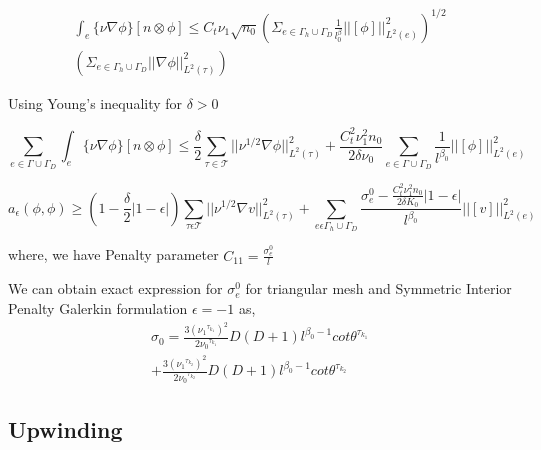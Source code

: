 \documentclass[a4paper,12pt]{book}
\begin{document}
\begin{equation}
\begin{split}
\int_e \lbrace \nu \nabla \phi \rbrace[n \otimes \phi] \leq C_t \nu_1 \sqrt{n_0} \left( \Sigma_{e \in \Gamma_h \cup \Gamma_D} \frac{1}{l^\beta_0} ||[\phi]||^2_{L^2(e)} \right)^{1/2} \\ \left( \Sigma_{e \in \Gamma_h \cup \Gamma_D} ||\nabla \phi||^2_{L^2(\tau)} \right)
\end{split}
\end{equation}

Using Young's inequality for $\delta > 0$

\begin{equation}
\sum_{e \in \Gamma \cup \Gamma_D} \int_e \lbrace \nu \nabla \phi \rbrace [n \otimes \phi] \leq \frac{\delta}{2} \sum_{\tau \in \mathcal{T}} ||\nu^{1/2} \nabla \phi ||^2_{L^2(\tau)} +  \frac{C_t^2 \nu_1^2 n_0}{2 \delta \nu_0}  \sum_{e \in \Gamma \cup \Gamma_D} \frac{1}{l^{\beta_0}} ||[\phi]||^2_{L^2(e)}
\end{equation}


\begin{equation}
a_\epsilon (\phi , \phi) \geq \left( 1-\frac{\delta}{2} |1-\epsilon| \right) \sum_{\tau \epsilon \mathcal{T}} ||\nu^{1/2} \nabla v ||^2_{L^2(\tau)} + \sum_{e \epsilon \Gamma_h \cup \Gamma_D} \frac{\sigma_e^0 - \frac{C_t^2 \nu_1^2 n_0}{2 \delta K_0}|1-\epsilon|}{l^{\beta_0}} ||[v]||^2_{L^2(e)}
\end{equation}

where, we have Penalty parameter $C_{11} = \frac{\sigma^0_e}{l}$

We can obtain exact expression for $\sigma^0_e$ for triangular mesh and Symmetric Interior Penalty Galerkin formulation $\epsilon = -1$ as,\\
\begin{equation}
\begin{split}
\sigma_0 = \frac{3 ( {\nu_1}^{\tau_{k_1}})^2}{2 {\nu_0}^{\tau_{k_1}}} D (D+1) l^{\beta_0 - 1} cot {\theta^{\tau_{k_1}}}  \\ + \frac{3 ( {\nu_1}^{\tau_{k_2}})^2}{2 {\nu_0}^{\tau_{k_2}}} D (D+1) l^{\beta_0 - 1} cot {\theta^{\tau_{k_2}}}
\end{split}
\end{equation} 

\subsection{Upwinding} \label{upwinding}
\end{document}
